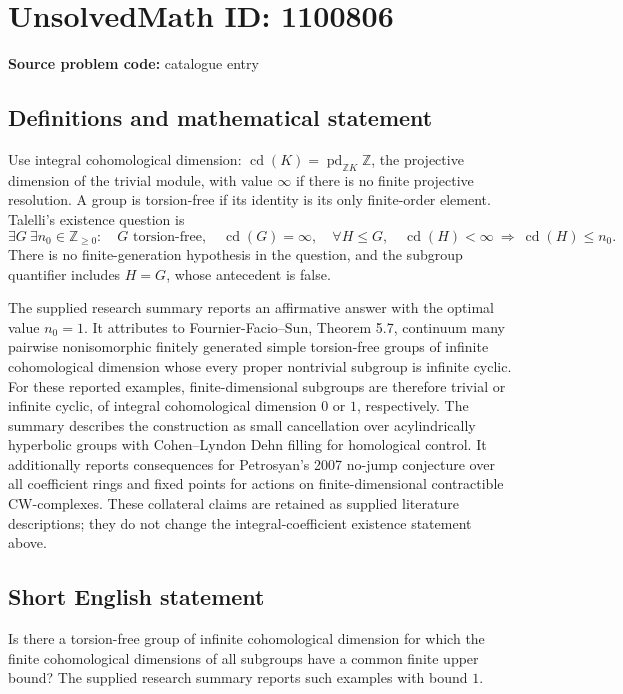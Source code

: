 \documentclass[11pt]{article}
\newcommand{\Z}{\mathbb{Z}}
\begin{document}
\section*{UnsolvedMath ID: 1100806}
\textbf{Source problem code:} catalogue entry
\subsection{Definitions and mathematical statement}
Use integral cohomological dimension: \(\operatorname{cd}(K)=\operatorname{pd}_{\Z K}\Z\), the projective dimension of the trivial module, with value \(\infty\) if there is no finite projective resolution. A group is torsion-free if its identity is its only finite-order element. Talelli's existence question is
\[
\exists G\ \exists n_0\in\Z_{\ge0}:\quad
G\text{ torsion-free},\quad \operatorname{cd}(G)=\infty,\quad
\forall H\le G,\quad
\operatorname{cd}(H)<\infty\ \Longrightarrow\ \operatorname{cd}(H)\le n_0.
\]
There is no finite-generation hypothesis in the question, and the subgroup quantifier includes \(H=G\), whose antecedent is false.

The supplied research summary reports an affirmative answer with the optimal value \(n_0=1\). It attributes to Fournier-Facio--Sun, Theorem 5.7, continuum many pairwise nonisomorphic finitely generated simple torsion-free groups of infinite cohomological dimension whose every proper nontrivial subgroup is infinite cyclic. For these reported examples, finite-dimensional subgroups are therefore trivial or infinite cyclic, of integral cohomological dimension \(0\) or \(1\), respectively. The summary describes the construction as small cancellation over acylindrically hyperbolic groups with Cohen--Lyndon Dehn filling for homological control. It additionally reports consequences for Petrosyan's 2007 no-jump conjecture over all coefficient rings and fixed points for actions on finite-dimensional contractible CW-complexes. These collateral claims are retained as supplied literature descriptions; they do not change the integral-coefficient existence statement above.
\subsection{Short English statement}
Is there a torsion-free group of infinite cohomological dimension for which the finite cohomological dimensions of all subgroups have a common finite upper bound? The supplied research summary reports such examples with bound \(1\).
\end{document}
